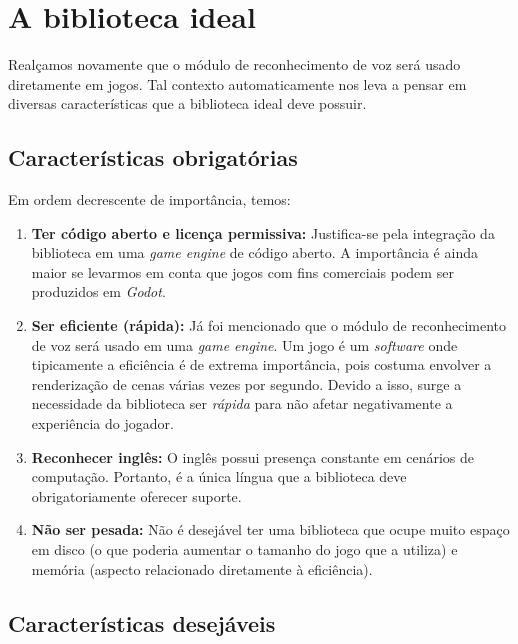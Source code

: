 \section{A biblioteca ideal}

Realçamos novamente que o módulo de reconhecimento de voz será usado diretamente em jogos. Tal contexto automaticamente nos leva a pensar em diversas características que a biblioteca ideal deve possuir.


\subsection{Características obrigatórias}

Em ordem decrescente de importância, temos:

\begin{enumerate}
\item \textbf{Ter código aberto e licença permissiva:} Justifica-se pela integração da biblioteca em uma \textit{game engine} de código aberto. A importância é ainda maior se levarmos em conta que jogos com fins comerciais podem ser produzidos em \textit{Godot}.

\item \textbf{Ser eficiente (rápida):} Já foi mencionado que o módulo de reconhecimento de voz será usado em uma \textit{game engine}. Um jogo é um \textit{software} onde tipicamente a eficiência é de extrema importância, pois costuma envolver a renderização de cenas várias vezes por segundo. Devido a isso, surge a necessidade da biblioteca ser \emph{rápida} para não afetar negativamente a experiência do jogador.

\item \textbf{Reconhecer inglês:} O inglês possui presença constante em cenários de computação. Portanto, é a única língua que a biblioteca deve obrigatoriamente oferecer suporte.

\item \textbf{Não ser pesada:} Não é desejável ter uma biblioteca que ocupe muito espaço em disco (o que poderia aumentar o tamanho do jogo que a utiliza) e memória (aspecto relacionado diretamente à eficiência).
\end{enumerate}


\subsection{Características desejáveis}

